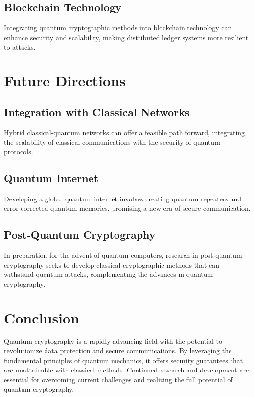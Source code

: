 \documentclass[12pt]{article}
\begin{document}
\subsection{Blockchain Technology}
Integrating quantum cryptographic methods into blockchain technology can enhance security and scalability, making distributed ledger systems more resilient to attacks.

\section{Future Directions}
\subsection{Integration with Classical Networks}
Hybrid classical-quantum networks can offer a feasible path forward, integrating the scalability of classical communications with the security of quantum protocols.

\subsection{Quantum Internet}
Developing a global quantum internet involves creating quantum repeaters and error-corrected quantum memories, promising a new era of secure communication.

\subsection{Post-Quantum Cryptography}
In preparation for the advent of quantum computers, research in post-quantum cryptography seeks to develop classical cryptographic methods that can withstand quantum attacks, complementing the advances in quantum cryptography.

\section{Conclusion}
Quantum cryptography is a rapidly advancing field with the potential to revolutionize data protection and secure communications. By leveraging the fundamental principles of quantum mechanics, it offers security guarantees that are unattainable with classical methods. Continued research and development are essential for overcoming current challenges and realizing the full potential of quantum cryptography.



\end{document}
